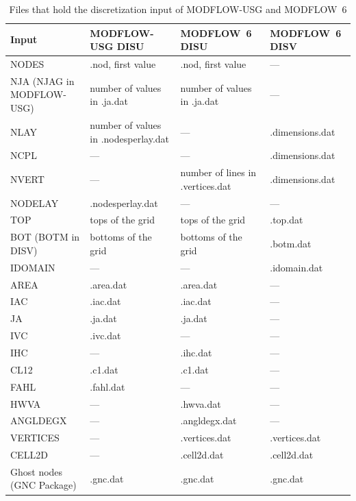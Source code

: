\documentclass[11pt,twoside,twocolumn]{usgsreport}
\begin{document}
\begin{table}[htbp]
\caption{Files that hold the discretization input of MODFLOW-USG and MODFLOW~6}
\label{tab:modelinput}
\small
\begin{tabular}{p{}p{}p{}p{}}
\hline
Input & MODFLOW-USG DISU & MODFLOW~6 DISU & MODFLOW~6 DISV \\
\hline
NODES & .nod, first value & .nod, first value & --- \\
NJA (NJAG in MODFLOW-USG) & number of values in .ja.dat & number of values in .ja.dat & --- \\
NLAY & number of values in .nodesperlay.dat & --- & .dimensions.dat \\
NCPL & --- & --- & .dimensions.dat \\
NVERT & --- & number of lines in .vertices.dat & .dimensions.dat \\
NODELAY & .nodesperlay.dat & --- & --- \\
TOP & tops of the grid & tops of the grid & .top.dat \\
BOT (BOTM in DISV) & bottoms of the grid & bottoms of the grid & .botm.dat \\
IDOMAIN & --- & --- & .idomain.dat \\
AREA & .area.dat & .area.dat & --- \\
IAC & .iac.dat & .iac.dat & --- \\
JA & .ja.dat & .ja.dat & --- \\
IVC & .ivc.dat & --- & --- \\
IHC & --- & .ihc.dat & --- \\
CL12 & .c1.dat & .c1.dat & --- \\
FAHL & .fahl.dat & --- & --- \\
HWVA & --- & .hwva.dat & --- \\
ANGLDEGX & --- & .angldegx.dat & --- \\
VERTICES & --- & .vertices.dat & .vertices.dat \\
CELL2D & --- & .cell2d.dat & .cell2d.dat \\
Ghost nodes (GNC Package) & .gnc.dat & .gnc.dat & .gnc.dat \\
\hline
\end{tabular}
\end{table}
\end{document}
